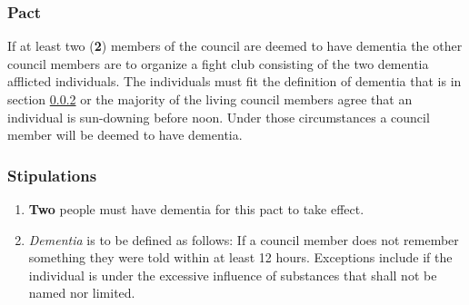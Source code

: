 \documentclass[letterpaper]{article}
\begin{document}
\subsubsection{Pact}
\label{subsubsec:pacts:dementia:pac}
If at least two (\textbf{2}) members of the council are deemed to have dementia the other council members are to organize a fight club consisting of the two dementia afflicted individuals.
The individuals must fit the definition of dementia that is in section \ref{subsubsec:pacts:dementia:stips} or the majority of the living council members agree that an individual is sun-downing before noon. Under those circumstances a council member will be deemed to have dementia.

\subsubsection{Stipulations}
\label{subsubsec:pacts:dementia:stips}
\begin{enumerate}
	\item \textbf{Two} people must have dementia for this pact to take effect. 

	\item \noindent \textit{Dementia} is to be defined as follows: If a council member does not remember something they were told within at least 12 hours.
	Exceptions include if the individual is under the excessive influence of substances that shall not be named nor limited.
\end{enumerate}
\end{document}
